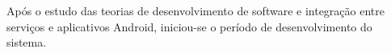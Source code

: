 
	\par Após o estudo das teorias de desenvolvimento de software e integração
entre serviços e aplicativos Android, iniciou-se o período de desenvolvimento
do sistema.
